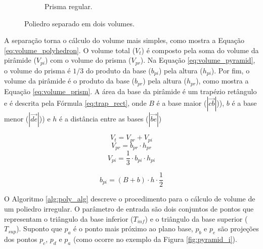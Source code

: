 \begin{figure}[H]
\begin{subfigure}[t]{0.4\textwidth}
        \caption{Prisma regular.}
        \label{fig:prism_i}
    \end{subfigure}
    \caption{Poliedro separado em dois volumes.}
\end{figure}

A separação torna o cálculo do volume mais simples, como mostra a Equação \ref{eq:volume_polyhedron}. 
O volume total ($V_t$) é composto pela soma do volume da pirâmide ($V_{pi}$) com o volume do prisma ($V_{pr}$).
Na Equação \ref{eq:volume_pyramid}, o volume do prisma é $1/3$ do produto da base ($b_{pi}$) pela altura ($h_{pi}$). 
Por fim, o volume da pirâmide é o produto da base ($b_{pr}$) pela altura  ($h_{pr}$), como mostra a Equação \ref{eq:volume_prism}.
A área da base da pirâmide é um trapézio retângulo e é descrita pela Fórmula \ref{eq:trap_rect}, onde $B$ é a base maior ($\left | \overrightarrow{cb} \right |$)), $b$ é a base menor ($\left | \overrightarrow{de} \right |$)) e $h$ é a distância entre as bases ($\left | \overrightarrow{be} \right |$)


\begin{multicols}{3}
    \begin{equation}
        \label{eq:volume_polyhedron}
        V_t = V_{pr} + V_{pi}
    \end{equation}
    \begin{equation}
        \label{eq:volume_pyramid}
        V_{pr} = b_{pr} \cdot h_{pr}
    \end{equation}
    \begin{equation}
        \label{eq:volume_prism}
        V_{pi} = \frac{1}{3} \cdot b_{pi} \cdot h_{pi}
    \end{equation}
\end{multicols}

\begin{equation}
    \label{eq:trap_rect}
    b_{pi} = (B+b) \cdot h \cdot \frac{1}{2}
\end{equation}
\vspace{0.5em}

\iffalse
O Algoritmo \ref{alg:poly_alg} descreve o procedimento para o cálculo de volume de um poliedro irregular. 
O parâmetro de entrada são dois conjuntos de pontos que representam o triângulo da base inferior ($T_{inf}$) e o triângulo da base superior ($T_{sup}$).
Suponto que $p_a$ é o ponto mais próximo ao plano base, $p_b$ e $p_e$ são projeções dos pontos $p_c$, $p_d$ e $p_a$ (como ocorre no exemplo da Figura \ref{fig:pyramid_i}).

